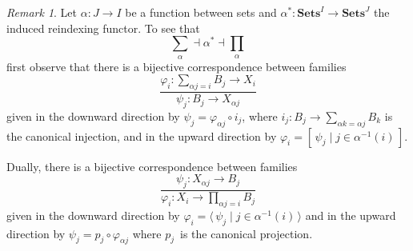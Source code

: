 \documentclass[letterpaper,12pt]{article}
\newcommand{\adj}{\dashv}
\newcommand{\adjrule}{\frac}
\newcommand{\after}{\circ}
\newcommand{\pairing}[1]{\langle#1\rangle}
\newcommand{\copairing}[1]{[#1]}
\newcommand{\inv}[1]{#1^{-1}}
\newcommand{\cat}[1]{\mathbf{#1}}
\newcommand{\Sets}{\cat{Sets}}
\theoremstyle{definition}
\theoremstyle{remark}
\newtheorem*{rmk}{Remark}
\theoremstyle{direction}
\begin{document}
\begin{rmk}
Let \(\alpha:J\to I\) be a function between sets and \(\alpha^*:\Sets^I\to\Sets^J\) the induced reindexing functor. To see that
\[\textstyle\sum_{\alpha}\adj\alpha^*\adj\prod_{\alpha}\]
first observe that there is a bijective correspondence between families
\[\adjrule{\varphi_i:\sum_{\alpha j=i}B_j\to X_i}{\psi_j:B_j\to X_{\alpha j}}\]
given in the downward direction by \(\psi_j=\varphi_{\alpha j}\after i_j\), where \(i_j:B_j\to\sum_{\alpha k=\alpha j}B_k\) is the canonical injection, and in the upward direction by \(\varphi_i=\copairing{\,\psi_j\mid j\in\inv{\alpha}(i)\,}\).

Dually, there is a bijective correspondence between families
\[\adjrule{\psi_j:X_{\alpha j}\to B_j}{\varphi_i:X_i\to\prod_{\alpha j=i}B_j}\]
given in the downward direction by \(\varphi_i=\pairing{\,\psi_j\mid j\in\inv{\alpha}(i)\,}\) and in the upward direction by \(\psi_j=p_j\after\varphi_{\alpha j}\) where \(p_j\)~is the canonical projection.
\end{rmk}
\end{document}

